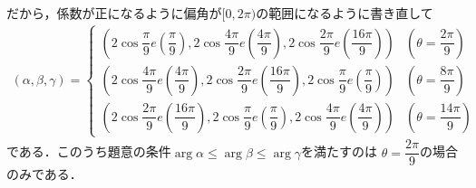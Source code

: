 \documentclass[../../main.tex]{subfiles}
\begin{document}
だから，係数が正になるように偏角が$[0,2\pi)$の範囲になるように書き直して
\begin{align}
  (\alpha,\beta,\gamma) =
  \begin{cases}
    \left(2 \cos \dfrac{\pi}{9} e\left(\dfrac{\pi}{9}\right),2 \cos \dfrac{4\pi}{9} e\left(\dfrac{4\pi}{9}\right),2 \cos \dfrac{2\pi}{9} e\left(\dfrac{16\pi}{9}\right)\right)
    & (\theta = \dfrac{2\pi}{9})\\
    \left(2 \cos \dfrac{4\pi}{9} e\left(\dfrac{4\pi}{9}\right),2 \cos \dfrac{2\pi}{9} e\left(\dfrac{16\pi}{9}\right),2 \cos \dfrac{\pi}{9} e\left(\dfrac{\pi}{9}\right)\right)
    & (\theta = \dfrac{8\pi}{9}) \\
    \left(2 \cos \dfrac{2\pi}{9} e\left(\dfrac{16\pi}{9}\right),2 \cos \dfrac{\pi}{9} e\left(\dfrac{\pi}{9}\right),2 \cos \dfrac{4\pi}{9} e\left(\dfrac{4\pi}{9}\right)\right)
    & (\theta = \dfrac{14\pi}{9})
  \end{cases}
\end{align}
である．このうち題意の条件$\arg\alpha \le \arg\beta \le \arg\gamma$を満たすのは
$\theta = \dfrac{2\pi}{9}$の場合のみである．
\end{document}
